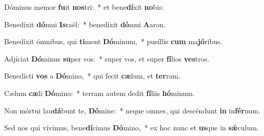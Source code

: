 \item Dóminus memor \textbf{fu}it \textbf{nos}tri:~* et bene\textbf{dí}xit \textbf{no}bis:
\item Benedíxit \textbf{dó}mui \textbf{Is}raël:~* benedíxit \textbf{dó}mui \textbf{A}aron.
\item Benedíxit ómnibus, qui \textbf{ti}ment \textbf{Dó}minum,~* pusíllis \textbf{cum} ma\textbf{jó}ribus.
\item Adjíciat \textbf{Dó}minus \textbf{su}per vos:~* super vos, et super \textbf{fí}lios \textbf{ves}tros.
\item Benedícti \textbf{vos} a \textbf{Dó}mino,~* qui fecit \textbf{cæ}lum, et \textbf{ter}ram.
\item Cælum \textbf{cæ}li \textbf{Dó}mino:~* terram autem dedit \textbf{fí}liis \textbf{hó}minum.
\item Non mórtui lau\textbf{dá}bunt te, \textbf{Dó}mine:~* neque omnes, qui descéndunt \textbf{in} in\textbf{fér}num.
\item Sed nos qui vívimus, bene\textbf{dí}cimus \textbf{Dó}mino,~* ex hoc nunc et \textbf{us}que in \textbf{sǽ}culum.
